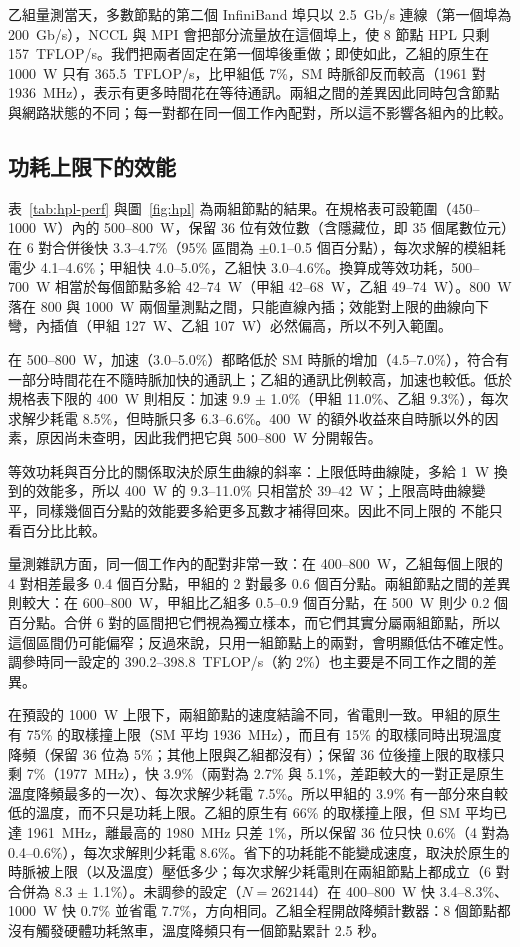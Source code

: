 乙組量測當天，多數節點的第二個 InfiniBand 埠只以 2.5~Gb/s 連線（第一個埠為 200~Gb/s），NCCL 與 MPI 會把部分流量放在這個埠上，使 8 節點 HPL 只剩 157~TFLOP/s。我們把兩者固定在第一個埠後重做；即使如此，乙組的原生在 1000~W 只有 365.5~TFLOP/s，比甲組低 7\%，SM 時脈卻反而較高（1961 對 1936~MHz），表示有更多時間花在等待通訊。兩組之間的差異因此同時包含節點與網路狀態的不同；每一對都在同一個工作內配對，所以這不影響各組內的比較。

\subsection{功耗上限下的效能}\label{sec:hpl-perf}

表~\ref{tab:hpl-perf} 與圖~\ref{fig:hpl} 為兩組節點的結果。在規格表可設範圍（450–1000~W）內的 500–800~W，保留 36 位有效位數（含隱藏位，即 35 個尾數位元）在 6 對合併後快 3.3–4.7\%（95\% 區間為 $\pm$0.1–0.5 個百分點），每次求解的模組耗電少 4.1–4.6\%；甲組快 4.0–5.0\%，乙組快 3.0–4.6\%。換算成等效功耗，500–700~W 相當於每個節點多給 42–74~W（甲組 42–68~W，乙組 49–74~W）。800~W 落在 800 與 1000~W 兩個量測點之間，只能直線內插；效能對上限的曲線向下彎，內插值（甲組 127~W、乙組 107~W）必然偏高，所以不列入範圍。

在 500–800~W，加速（3.0–5.0\%）都略低於 SM 時脈的增加（4.5–7.0\%），符合有一部分時間花在不隨時脈加快的通訊上；乙組的通訊比例較高，加速也較低。低於規格表下限的 400~W 則相反：加速 9.9 $\pm$ 1.0\%（甲組 11.0\%、乙組 9.3\%），每次求解少耗電 8.5\%，但時脈只多 6.3–6.6\%。400~W 的額外收益來自時脈以外的因素，原因尚未查明，因此我們把它與 500–800~W 分開報告。

等效功耗與百分比的關係取決於原生曲線的斜率：上限低時曲線陡，多給 1~W 換到的效能多，所以 400~W 的 9.3–11.0\% 只相當於 39–42~W；上限高時曲線變平，同樣幾個百分點的效能要多給更多瓦數才補得回來。因此不同上限的 \DW{} 不能只看百分比比較。

量測雜訊方面，同一個工作內的配對非常一致：在 400–800~W，乙組每個上限的 4 對相差最多 0.4 個百分點，甲組的 2 對最多 0.6 個百分點。兩組節點之間的差異則較大：在 600–800~W，甲組比乙組多 0.5–0.9 個百分點，在 500~W 則少 0.2 個百分點。合併 6 對的區間把它們視為獨立樣本，而它們其實分屬兩組節點，所以這個區間仍可能偏窄；反過來說，只用一組節點上的兩對，會明顯低估不確定性。調參時同一設定的 390.2–398.8~TFLOP/s（約 2\%）也主要是不同工作之間的差異。

在預設的 1000~W 上限下，兩組節點的速度結論不同，省電則一致。甲組的原生有 75\% 的取樣撞上限（SM 平均 1936~MHz），而且有 15\% 的取樣同時出現溫度降頻（保留 36 位為 5\%；其他上限與乙組都沒有）；保留 36 位後撞上限的取樣只剩 7\%（1977~MHz），快 3.9\%（兩對為 2.7\% 與 5.1\%，差距較大的一對正是原生溫度降頻最多的一次）、每次求解少耗電 7.5\%。所以甲組的 3.9\% 有一部分來自較低的溫度，而不只是功耗上限。乙組的原生有 66\% 的取樣撞上限，但 SM 平均已達 1961~MHz，離最高的 1980~MHz 只差 1\%，所以保留 36 位只快 0.6\%（4 對為 0.4–0.6\%），每次求解則少耗電 8.6\%。省下的功耗能不能變成速度，取決於原生的時脈被上限（以及溫度）壓低多少；每次求解少耗電則在兩組節點上都成立（6 對合併為 8.3 $\pm$ 1.1\%）。未調參的設定（$N = 262144$）在 400–800~W 快 3.4–8.3\%、1000~W 快 0.7\% 並省電 7.7\%，方向相同。乙組全程開啟降頻計數器：8 個節點都沒有觸發硬體功耗煞車，溫度降頻只有一個節點累計 2.5 秒。

